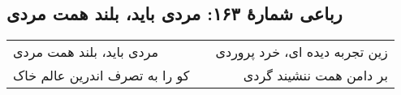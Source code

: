 \begin{center}
\section*{رباعی شمارهٔ ۱۶۳: مردی باید، بلند همت مردی}
\label{sec:163}
\begin{longtable}{l p{0.5cm} r}
مردی باید، بلند همت مردی
&&
زین تجربه دیده ای، خرد پروردی
\\
کو را به تصرف اندرین عالم خاک
&&
بر دامن همت ننشیند گردی 
\\
\end{longtable}
\end{center}
